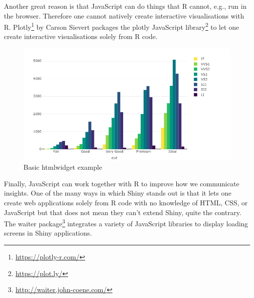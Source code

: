 \documentclass[10pt,]{krantz}
\makeatletter
\newenvironment{Shaded}{\begin{snugshade}}{\end{snugshade}}
\newcommand{\DataTypeTok}[1]{\textcolor[rgb]{0.27,0.27,0.27}{#1}}
\newcommand{\KeywordTok}[1]{\textcolor[rgb]{0.27,0.27,0.27}{\textbf{#1}}}
\newcommand{\NormalTok}[1]{#1}
\newcommand{\OperatorTok}[1]{\textcolor[rgb]{0.43,0.43,0.43}{\textbf{#1}}}
\newcommand{\StringTok}[1]{\textcolor[rgb]{0.5,0.5,0.5}{#1}}
\renewcommand{\href}[2]{#2\footnote{\url{#1}}}
\newenvironment{kframe}{%
\medskip{}
\setlength{\fboxsep}{.8em}
 \def\at@end@of@kframe{}%
 \ifinner\ifhmode%
  \def\at@end@of@kframe{\end{minipage}}%
  \begin{minipage}{\columnwidth}%
 \fi\fi%
 \def\FrameCommand##1{\hskip\@totalleftmargin \hskip-\fboxsep
 \colorbox{shadecolor}{##1}\hskip-\fboxsep
     \hskip-\linewidth \hskip-\@totalleftmargin \hskip\columnwidth}%
 \MakeFramed {\advance\hsize-\width
   \@totalleftmargin\z@ \linewidth\hsize
   \@setminipage}}%
 {\par\unskip\endMakeFramed%
 \at@end@of@kframe}
\renewenvironment{Shaded}{\begin{kframe}}{\end{kframe}}
\makeatother
\begin{document}
Another great reason is that JavaScript can do things that R cannot, e.g., run in the browser. Therefore one cannot natively create interactive visualisations with R. \href{https://plotly-r.com/}{Plotly} \citep{R-plotly} by Carson Sievert packages the \href{https://plot.ly/}{plotly JavaScript library} to let one create interactive visualisations solely from R code.

\begin{Shaded}
\end{Shaded}

\begin{figure}[H]

{\centering \includegraphics[width=1\linewidth]{images/01-plotly} 

}

\caption{Basic htmlwidget example}\label{fig:plotly-basic-example}
\end{figure}

Finally, JavaScript can work together with R to improve how we communicate insights. One of the many ways in which Shiny stands out is that it lets one create web applications solely from R code with no knowledge of HTML, CSS, or JavaScript but that does not mean they can't extend Shiny, quite the contrary. The \href{http://waiter.john-coene.com/}{waiter package} \citep{R-waiter} integrates a variety of JavaScript libraries to display loading screens in Shiny applications.
\end{document}
